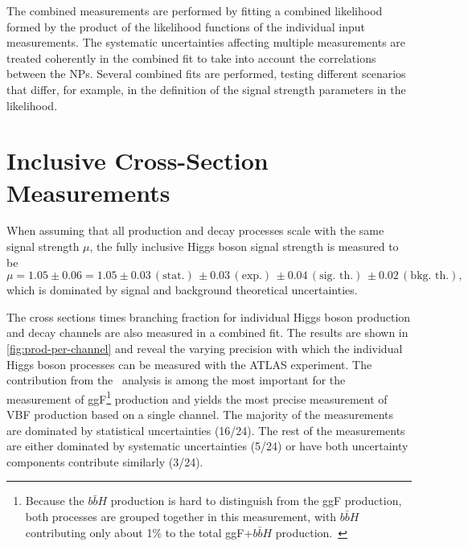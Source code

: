 The combined measurements are performed by fitting a combined likelihood formed by the product of the likelihood functions of the individual input measurements. 
The systematic uncertainties affecting multiple measurements are treated coherently in the combined fit to take into account the correlations between the NPs. 
Several combined fits are performed, testing different scenarios that differ, for example, in the definition of the signal strength parameters in the likelihood.


\section{Inclusive Cross-Section Measurements}
When assuming that all production and decay processes scale with the same signal strength $\mu$, the fully inclusive Higgs boson signal strength is measured to be 
\begin{equation*}
   \mu =1.05 \pm 0.06 = 1.05\pm 0.03\, (\text{stat.})\, \pm 0.03\, (\text{exp.})\, \pm 0.04\, (\text{sig.\ th.})\, \pm 0.02\, (\text{bkg.\ th.}),
\end{equation*}
which is dominated by signal and background theoretical uncertainties. 

The cross sections times branching fraction for individual Higgs boson production and decay channels are also measured in a combined fit.
The results are shown in \cref{fig:prod-per-channel} and reveal the varying precision with which the individual Higgs boson processes can be measured with the ATLAS experiment.
The contribution from the \HWW\ analysis is among the most important for the measurement of ggF\footnote{Because the $b\bar{b}H$ production is hard to distinguish from the ggF production, both processes are grouped together in this measurement, with $b\bar{b}H$ contributing only about 1\% to the total ggF+$b\bar{b}H$ production.~\cite{NaturePaper}} production and yields the most precise measurement of VBF production based on a single channel. 
The majority of the measurements are dominated by statistical uncertainties (16/24). The rest of the measurements are either dominated by systematic uncertainties (5/24) or have both uncertainty components contribute similarly (3/24). 

